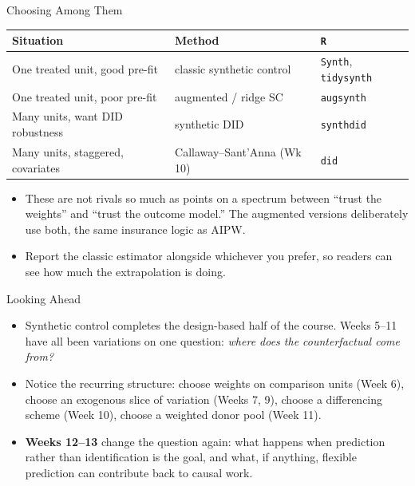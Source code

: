 \documentclass[aspectratio=169,11pt,xcolor=dvipsnames]{beamer}
\begin{document}
\begin{frame}{Choosing Among Them}
\begin{center}\footnotesize
\renewcommand{\arraystretch}{1.3}
\begin{tabular}{lll}
\toprule
Situation & Method & \texttt{R} \\
\midrule
One treated unit, good pre-fit & classic synthetic control & \texttt{Synth}, \texttt{tidysynth} \\
One treated unit, poor pre-fit & augmented / ridge SC & \texttt{augsynth} \\
Many units, want DID robustness & synthetic DID & \texttt{synthdid} \\
Many units, staggered, covariates & Callaway--Sant'Anna (Wk 10) & \texttt{did} \\
\bottomrule
\end{tabular}
\end{center}
\vskip5pt
\begin{itemize}\itemsep2pt
  \item These are not rivals so much as points on a spectrum between ``trust the
        weights'' and ``trust the outcome model.'' The augmented versions
        deliberately use both, the same insurance logic as AIPW.
  \item Report the classic estimator alongside whichever you prefer, so readers
        can see how much the extrapolation is doing.
\end{itemize}
\end{frame}

\begin{frame}{Looking Ahead}
\begin{itemize}\itemsep4pt
  \item Synthetic control completes the design-based half of the course. Weeks
        5--11 have all been variations on one question: \emph{where does the
        counterfactual come from?}
  \item Notice the recurring structure: choose weights on comparison units
        (Week 6), choose an exogenous slice of variation (Weeks 7, 9), choose a
        differencing scheme (Week 10), choose a weighted donor pool (Week 11).
  \item \textbf{Weeks 12--13} change the question again: what happens when
        prediction rather than identification is the goal, and what, if
        anything, flexible prediction can contribute back to causal work.
\end{itemize}
\end{frame}
\end{document}
